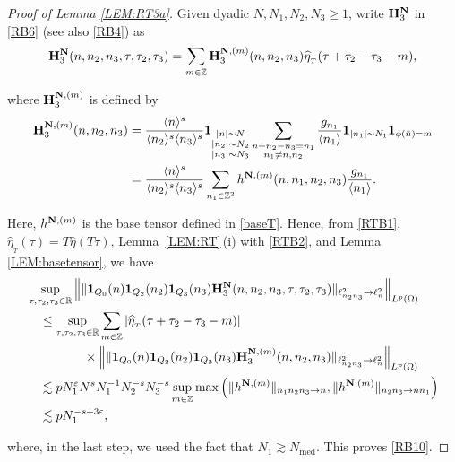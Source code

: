 \documentclass[%
11pt,  reqno]{amsart}
\DeclareMathOperator{\med}{med}
\newcommand{\1}{\hspace{0.2mm}\text{I}\hspace{0.2mm}}
\newcommand{\noi}{\noindent}
\newcommand{\Z}{\mathbb{Z}}
\newcommand{\R}{\mathbb{R}}
\newcommand{\eps}{\varepsilon}
\newcommand{\ft}{\widehat}
\renewcommand{\l}{\ell}
\renewcommand{\O}{\Omega}
\newcommand{\les}{\lesssim}
\newcommand{\ges}{\gtrsim}
\newcommand{\jb}[1]
{\langle #1 \rangle}
\newcommand{\ind}{\mathbf 1}
\numberwithin{equation}{section}
\numberwithin{theorem}{section}
\newcommand{\Hb}{\mathbf{H}}
\begin{document}
\begin{proof}[Proof of Lemma \ref{LEM:RT3a}]

Given dyadic $N, N_1, N_2, N_3 \ge 1$, write $\Hb_3^{\bf N}$
in \eqref{RB6} (see also \eqref{RB4})
as 
\begin{align}
\Hb_3^{\bf N}(n,n_2,n_3,\tau,\tau_2,\tau_3)
= \sum_{m \in \Z} \Hb^{{\bf N}, (m)}_3 (n, n_2, n_3 )\ft \eta_{_T} (\tau + \tau_2 - \tau_3 - m),   
\label{RTB1}
\end{align}



\noi
where $\Hb^{{\bf N}, (m)}_3$ is defined by 
\begin{align}
\begin{split}
 \Hb^{{\bf N}, (m)}_3 (n, n_2, n_3)
& =  \frac{\jb{n}^{s}}{ \jb{n_2}^{s}\jb{n_3}^{s}} 
\ind_{\substack{|n| \sim N\\|n_2| \sim N_2\\|n_3| \sim N_3}}
\sum_{\substack{n + n_2 - n_3= n_1 \\ n_1 \neq n,n_2}} 
\frac{g_{n_1} }{\jb{n_1}}
\ind_{|n_1|\sim N_1}
\ind_{ \phi (\bar n) = m}\\
& =  \frac{\jb{n}^{s}}{ \jb{n_2}^{s}\jb{n_3}^s} 
\sum_{n_1 \in \Z^2} 
h^{{\bf N}, (m)}(n, n_1, n_2, n_3)
\frac{g_{n_1}}{\jb{n_1}}.
\end{split}
\label{RTB2}
\end{align}


\noi
Here,  $h^{{\bf N}, (m)}$ is the base tensor defined in \eqref{baseT}. 
Hence, from \eqref{RTB1}, 
$\ft \eta_{_T}(\tau) = T \ft \eta (T\tau)$, 
Lemma~\ref{LEM:RT}\,(i) with \eqref{RTB2}, and Lemma \ref{LEM:basetensor}, we have
\[
\begin{split} 
& \sup_{\tau,\tau_2, \tau_3\in \R} \Big\|  \| 
 \ind_{Q_0} (n) \ind_{Q_2} (n_2)
 \ind_{Q_3} (n_3)
\Hb_3^{\bf N}(n,n_2,n_3,\tau,\tau_2,\tau_3) 
 \|_{\l^2_{n_2n_3} \to \l^2_n} \Big\|_{L^p(\O)}  \\
 & \quad \le \sup_{\tau,\tau_2, \tau_3\in \R} \sum_{m \in \Z}
|\ft \eta_{_T} (\tau + \tau_2 - \tau_3- m)| \\
& \hphantom{XXXXX}
\times \Big\| \| 
 \ind_{Q_0} (n) \ind_{Q_2} (n_2)
 \ind_{Q_3} (n_3)
 \Hb_3^{{\bf N}, (m)}(n,n_2,n_3)
\|_{\l^2_{n_2n_3} \to \l^2_n} \Big\|_{L^p(\O)}  \\
&\quad \les p  N_1^\eps N^s N_1^{-1}  N_2^{-s} N_3^{-s}
\sup_{m \in \Z}
\max\Big(  \|  h^{{\bf N}, (m)}  \|_{n_1n_2n_3   \to n },
 \|  h^{{\bf N}, (m)}  \|_{n_2n_3   \to n n_1}\Big)
  \\
& \quad \les p 
 N_1^{-s+ 3\eps}, 
\end{split}
\]

\noi
where, in the last step,  we used the fact that $N_1 \ges N_{\med}$.
This proves  \eqref{RB10}.
\end{proof}
\end{document}
